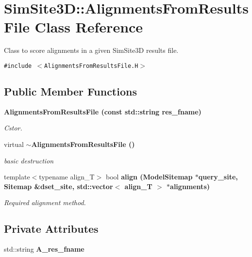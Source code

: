 \section{SimSite3D::Alignments\-From\-Results\-File Class Reference}
\label{classSimSite3D_1_1AlignmentsFromResultsFile}
Class to score alignments in a given Sim\-Site3D results file.  


{\tt \#include $<$Alignments\-From\-Results\-File.H$>$}

\subsection*{Public Member Functions}
\begin{CompactItemize}
\item 
\bf{Alignments\-From\-Results\-File} (const std::string res\_\-fname)\label{classSimSite3D_1_1AlignmentsFromResultsFile_0834e02449a91cc81b01e44566b3ca9c}

\begin{CompactList}\small\item\em Cstor. \item\end{CompactList}\item 
virtual \bf{$\sim$Alignments\-From\-Results\-File} ()\label{classSimSite3D_1_1AlignmentsFromResultsFile_ac17079e981f15b11ff09284843f1c60}

\begin{CompactList}\small\item\em basic destruction \item\end{CompactList}\item 
template$<$typename align\_\-T$>$ bool \bf{align} (\bf{Model\-Sitemap} $\ast$query\_\-site, \bf{Sitemap} \&dset\_\-site, std::vector$<$ align\_\-T $>$ $\ast$alignments)\label{classSimSite3D_1_1AlignmentsFromResultsFile_8a607016b81b625aa0debaa1d469067d}

\begin{CompactList}\small\item\em Required alignment method. \item\end{CompactList}\end{CompactItemize}
\subsection*{Private Attributes}
\begin{CompactItemize}
\item 
std::string \textbf{A\_\-res\_\-fname}\label{classSimSite3D_1_1AlignmentsFromResultsFile_629d9546382d3f8879e8a324b392584e}

\end{CompactItemize}



